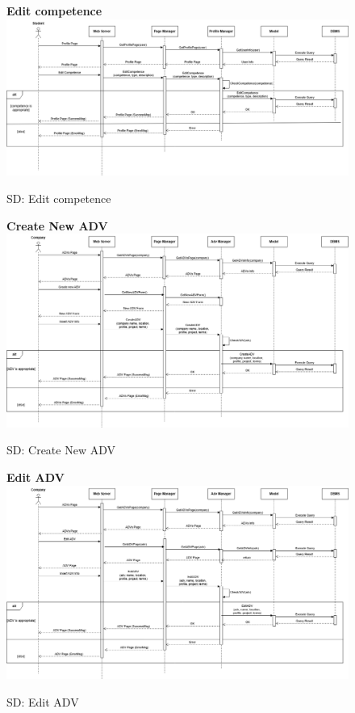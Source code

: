 \begin{figure}[H]
\textbf{Edit competence}\newline\newline
\includegraphics[width=15cm]{images/architectural design/runtime/DD-UC7.drawio.png}
    \caption{SD: Edit competence}
\end{figure}

\begin{figure}[H]
\textbf{Create New ADV}\newline\newline
\includegraphics[width=15cm]{images/architectural design/runtime/DD-UC8.drawio (1).png}
    \caption{SD: Create New ADV}
\end{figure}

\begin{figure}[H]
\textbf{Edit ADV}\newline\newline
\includegraphics[width=15cm]{images/architectural design/runtime/DD-UC9.drawio (1).png}
    \caption{SD: Edit ADV}
\end{figure}


